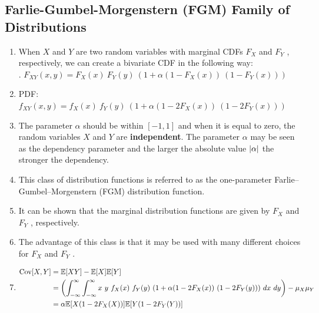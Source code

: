 \subsection{Farlie-Gumbel-Morgenstern (FGM) Family of Distributions}

\begin{enumerate}
    \item When $X$ and $Y$ are two random variables with marginal CDFs $F_X$ and $F_Y$ , respectively, we can create a bivariate CDF in the following way:
    \hfill \cite{statistics/book/Statistics-for-Data-Scientists/Maurits-Kaptein}
    \\[0.3cm]
    .\hfill
    $
        F _{X Y} (x, y) = F_X (x)\ F_Y (y)\ (1 + \alpha(1 - F_X (x))\ (1 - F_Y (x)))
    $
    \hfill \cite{statistics/book/Statistics-for-Data-Scientists/Maurits-Kaptein}

    \item PDF:
    $
        f _{X Y} (x, y) = f_X (x)\ f_Y (y)\ (1 + \alpha(1 - 2F_X (x))\ (1 - 2F_Y (x)))
    $
    \hfill \cite{statistics/book/Statistics-for-Data-Scientists/Maurits-Kaptein}

    \item The parameter $\alpha$ should be within $[-1, 1]$ and when it is equal to zero, the random variables $X$ and $Y$ are \textbf{independent}.
    The parameter $\alpha$ may be seen as the dependency parameter and the larger the absolute value $\left| \alpha \right|$ the stronger the dependency.
    \hfill \cite{statistics/book/Statistics-for-Data-Scientists/Maurits-Kaptein}

    \item This class of distribution functions is referred to as the one-parameter Farlie–Gumbel–Morgenstern (FGM) distribution function.
    \hfill \cite{statistics/book/Statistics-for-Data-Scientists/Maurits-Kaptein}

    \item It can be shown that the marginal distribution functions are given by $F_X$ and $F_Y$ , respectively.
    \hfill \cite{statistics/book/Statistics-for-Data-Scientists/Maurits-Kaptein}

    \item The advantage of this class is that it may be used with many different choices for $F_X$ and $F_Y$ .
    \hfill \cite{statistics/book/Statistics-for-Data-Scientists/Maurits-Kaptein}

    \item 
    $
        \begin{aligned}
            \text{Cov}[X, Y] 
            &= \mathbb{E}[X Y] - \mathbb{E}[X] \mathbb{E}[Y] \\
            & = \left(\displaystyle\int^\infty_{-\infty} \displaystyle\int^\infty_{-\infty} x\ y\ f_X (x)\ f_Y (y)\ (1 + \alpha(1 - 2F_X (x))\ (1 - 2F_Y (y)))\ dx\ dy\right) - \mu_X \mu_Y \\
            &= \alpha\mathbb{E}[X (1 - 2F_X (X ))]\mathbb{E}[Y (1 - 2F_Y (Y ))]
        \end{aligned}
    $
    \hfill \cite{statistics/book/Statistics-for-Data-Scientists/Maurits-Kaptein}


\end{enumerate}
